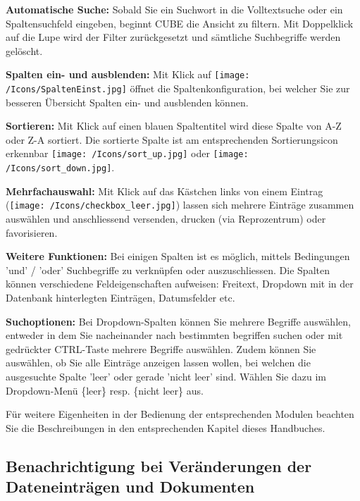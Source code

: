 \begin{compactitem}
	\item \textbf{Automatische Suche:} Sobald Sie ein Suchwort in die Volltextsuche oder ein Spaltensuchfeld eingeben, beginnt CUBE die Ansicht zu filtern. Mit Doppelklick auf die Lupe wird der Filter zurückgesetzt und sämtliche Suchbegriffe werden gelöscht.
	\item \textbf{Spalten ein- und ausblenden:} Mit Klick auf \texttt{[image: /Icons/SpaltenEinst.jpg]} öffnet die Spaltenkonfiguration, bei welcher Sie zur besseren Übersicht Spalten ein- und ausblenden können.
	\item \textbf{Sortieren:} Mit Klick auf einen blauen Spaltentitel wird diese Spalte von A-Z oder Z-A sortiert. Die sortierte Spalte ist am entsprechenden Sortierungsicon erkennbar \texttt{[image: /Icons/sort\_up.jpg]} oder \texttt{[image: /Icons/sort\_down.jpg]}.
		\item \textbf{Mehrfachauswahl:} Mit Klick auf das Kästchen links von einem Eintrag (\texttt{[image: /Icons/checkbox\_leer.jpg]}) lassen sich mehrere Einträge zusammen auswählen und anschliessend versenden, drucken (via Reprozentrum) oder favorisieren.
	\item \textbf{Weitere Funktionen:} Bei einigen Spalten ist es möglich, mittels Bedingungen 'und' / 'oder' Suchbegriffe zu verknüpfen oder auszuschliessen. Die Spalten können verschiedene Feldeigenschaften aufweisen: Freitext, Dropdown mit in der Datenbank hinterlegten Einträgen, Datumsfelder etc.
	\item \textbf{Suchoptionen:} Bei Dropdown-Spalten können Sie mehrere Begriffe auswählen, entweder in dem Sie nacheinander nach bestimmten begriffen suchen oder mit gedrückter CTRL-Taste mehrere Begriffe auswählen. Zudem können Sie auswählen, ob Sie alle Einträge anzeigen lassen wollen, bei welchen die ausgesuchte Spalte 'leer' oder gerade 'nicht leer' sind. Wählen Sie dazu im Dropdown-Menü \{leer\} resp. \{nicht leer\} aus. 
\end{compactitem}	

\vspace{\baselineskip}

Für weitere Eigenheiten in der Bedienung der entsprechenden Modulen beachten Sie die Beschreibungen in den entsprechenden Kapitel dieses Handbuches.

\subsection{Benachrichtigung bei Veränderungen der Dateneinträgen und Dokumenten}
\label{bkm:Ref2018080601}

